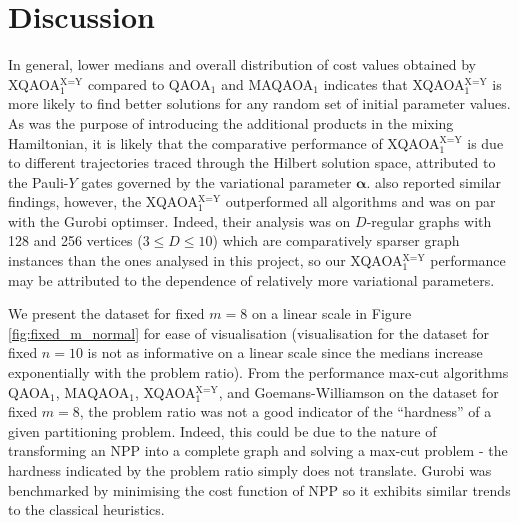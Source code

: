 \section{Discussion} \label{sec:disc}



In general, lower medians and overall distribution of cost values obtained by XQAOA$_1^\text{X=Y}$ compared to QAOA$_1$ and MAQAOA$_1$ indicates that XQAOA$_1^\text{X=Y}$ is more likely to find better solutions for any random set of initial parameter values. As was the purpose of introducing the additional products in the mixing Hamiltonian, it is likely that the comparative performance of XQAOA$_1^\text{X=Y}$ is due to different trajectories traced through the Hilbert solution space, attributed to the Pauli-$Y$ gates governed by the variational parameter $\pmb{\alpha}$. \citet{vijendran2023expressive} also reported similar findings, however, the XQAOA$_1^\text{X=Y}$ outperformed all algorithms and was on par with the Gurobi optimser. Indeed, their analysis was on $D$-regular graphs with 128 and 256 vertices ($3\leq D\leq 10$) which are comparatively sparser graph instances than the ones analysed in this project, so our XQAOA$_1^\text{X=Y}$ performance may be attributed to the dependence of relatively more variational parameters.

We present the dataset for fixed $m=8$ on a linear scale in Figure \ref{fig:fixed_m_normal} for ease of visualisation (visualisation for the dataset for fixed $n=10$ is not as informative on a linear scale since the medians increase exponentially with the problem ratio). From the performance max-cut algorithms QAOA$_1$, MAQAOA$_1$, XQAOA$_1^\text{X=Y}$, and Goemans-Williamson on the dataset for fixed $m=8$, the problem ratio was not a good indicator of the ``hardness'' of a given partitioning problem. Indeed, this could be due to the nature of transforming an NPP into a complete graph and solving a max-cut problem - the hardness indicated by the problem ratio simply does not translate. Gurobi was benchmarked by minimising the cost function of NPP so it exhibits similar trends to the classical heuristics. 


